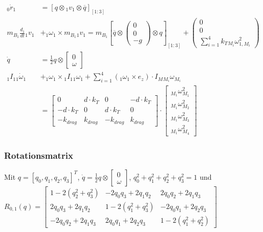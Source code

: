 \begin{align}
    {_{0}\dot{r}_{1}} &= \left[ q \otimes {_{1}v_{1}} \otimes \overline{q} \right]_{\left[1:3\right]} \\
    m_{B_1} \frac{d_1}{dt} {_{1}v_{1}} &+ {_{1}\omega_{1}} \times m_{B_1} {_{1}v_{1}} = m_{B_1} \left[\overline{q} \otimes \begin{pmatrix} 0 \\ 0 \\ -g \end{pmatrix} \otimes q \right]_{\left[1:3\right]} + {\begin{pmatrix} 0 \\ 0 \\ \sum_{i = 1}^4 k_{T} {_{M_i}\omega^2_{1, M_i}} \end{pmatrix}} \\
    \dot q &= \frac{1}{2} q \otimes \begin{bmatrix} 0 \\ \omega \end{bmatrix} \\
    {_{1} I_{1}} {_{1} \dot{\omega}_{1}} &+ {_{1} {\omega}_{1}} \times {_{1} I_{1}} {_{1} {\omega}_{1}} + \sum_{i=1}^{4}{({_{1}{\omega}_{1}} \times e_z) \cdot I_{M} {_{M_i}\omega_{M_i}} } \\
    &= \begin{bmatrix} 0              & d \cdot k_{T} & 0             & -d \cdot k_{T} \\ 
                       -d \cdot k_{T} & 0             & d \cdot k_{T} & 0  \\
                       -k_{drag}      & k_{drag}      & -k_{drag}    & k_{drag}
       \end{bmatrix}
    \cdot 
    \begin{bmatrix}
      {_{M_1} {\omega}^2_{M_1}} \\
      {_{M_1} {\omega}^2_{M_2}}\\
      {_{M_1} {\omega}^2_{M_3}}\\
      {_{M_1} {\omega}^2_{M_4}}
    \end{bmatrix}
\end{align}


\subsubsection{Rotationsmatrix}\label{subsub:Rotationsmatrix}
Mit $q = [q_0, q_1, q_2, q_3]^T$, $\dot q = \frac{1}{2} q \otimes \begin{bmatrix} 0 \\ \omega \end{bmatrix} $, $q_0^2 + q_1^2 + q_2^2 + q_3^2 = 1$ und \\
$R_{0, 1}(q) = \left[ \begin{matrix} 1-2(q_2^2 + q_3^2) &
-2q_0q_3+2q_1q_2 &
2q_0q_2+2q_1q_3 \\

2q_0q_3+2q_1q_2 &
1-2(q_1^2 + q_3^2) &
-2q_0q_1+2q_2q_3 \\

-2q_0q_2+2q_1q_3 &
2q_0q_1+2q_2q_3 &
1-2(q_1^2 + q_2^2)
\end{matrix}
\right]
$ 

